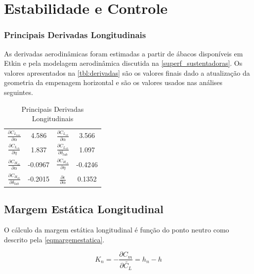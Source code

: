 \chapter{Estabilidade e Controle}
\label{estabilidade}

\subsection{Principais Derivadas Longitudinais}
\label{derivadas}

As derivadas aerodinâmicas foram estimadas a partir de ábacos disponíveis em Etkin \cite{etkin1996dynamics} e pela modelagem aerodinâmica discutida na \autoref{superf_sustentadoras}. Os valores apresentados na \autoref{tbl:derivadas} são os valores finais dado a atualização da geometria da empenagem horizontal e são os valores usados nas análises seguintes.

\begin{table}[H]
\centering
\begin{tabular}{cccc}
\toprule
$ \frac{\partial C_{L_{asa}}}{\partial \alpha} $ & 4.586 & $ \frac{\partial C_{L_{eh}}}{\partial \alpha} $ & 3.566 \\ [0.3cm]
$ \frac{\partial C_{L_{eh}}}{\partial \eta} $ & 1.837 & $ \frac{\partial C_{L_{eh}}}{\partial \delta_{tab}} $ & 1.097 \\ [0.3cm]
$ \frac{\partial C_{H_{eh}}}{\partial \alpha} $ & -0.0967  & $ \frac{\partial C_{H_{eh}}}{\partial \eta} $ & -0.4246 \\ [0.3cm]
$ \frac{\partial C_{H_{eh}}}{\partial \delta_{tab}} $ & -0.2015 & $ \frac{\partial \epsilon}{\partial \alpha} $ & 0.1352 \\ [0.3cm]
\bottomrule
\end{tabular}
\caption[Principais Derivadas Longitudinais]{Principais Derivadas Longitudinais}
\label{tbl:derivadas}
\end{table}

\section{Margem Estática Longitudinal}
\label{margem}

O cálculo da margem estática longitudinal é função do ponto neutro como descrito pela \autoref{eqmargemestatica}.

\begin{equation}
\label{eqmargemestatica}
K_n = - \frac{\partial C_m}{\partial \widetilde{C_L}} = h_n - h
\end{equation}

